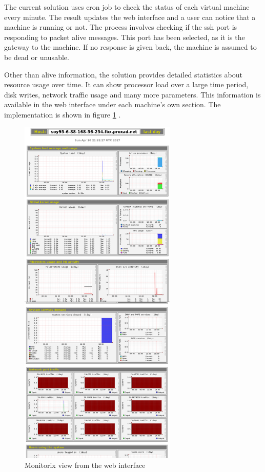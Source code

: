\documentclass{article}
\begin{document}
The current solution uses \gls{cron} job to check the status of each virtual machine every minute. The result updates the web interface and a user can notice that a machine is running or not. The process involves checking if the \gls{ssh} port is responding to packet alive messages. This port has been selected, as it is the gateway to the machine. If no response is given back, the machine is assumed to be dead or unusable.

Other than alive information, the solution provides detailed statistics about resource usage over time. It can show processor load over a large time period, disk writes, network traffic usage and many more parameters. This information is available in the web interface under each machine's own section. The implementation is shown in figure \ref{fig:healthmonitoring-page} .

\begin{figure}[ht]
	\vspace{0.5cm}
	\begin{center}
	\includegraphics[width=7.5cm]{monitorix_screenshot}
	\end{center}
	\vspace{0.5cm}
	\caption{Monitorix view from the web interface}
	\label{fig:healthmonitoring-page}
\end{figure}
\end{document}
